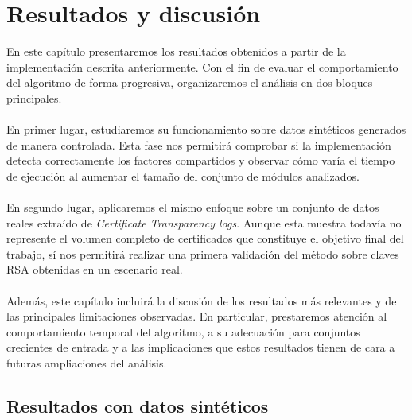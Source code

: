 \chapter{Resultados y discusión}

En este capítulo presentaremos los resultados obtenidos a partir de la implementación descrita anteriormente. Con el fin de evaluar el comportamiento del algoritmo de forma progresiva, organizaremos el análisis en dos bloques principales.
\\
\\
En primer lugar, estudiaremos su funcionamiento sobre datos sintéticos generados de manera controlada. Esta fase nos permitirá comprobar si la implementación detecta correctamente los factores compartidos y observar cómo varía el tiempo de ejecución al aumentar el tamaño del conjunto de módulos analizados.
\\
\\
En segundo lugar, aplicaremos el mismo enfoque sobre un conjunto de datos reales extraído de \textit{Certificate Transparency logs}. Aunque esta muestra todavía no represente el volumen completo de certificados que constituye el objetivo final del trabajo, sí nos permitirá realizar una primera validación del método sobre claves RSA obtenidas en un escenario real.
\\
\\
Además, este capítulo incluirá la discusión de los resultados más relevantes y de las principales limitaciones observadas. En particular, prestaremos atención al comportamiento temporal del algoritmo, a su adecuación para conjuntos crecientes de entrada y a las implicaciones que estos resultados tienen de cara a futuras ampliaciones del análisis.

\section{Resultados con datos sintéticos}


